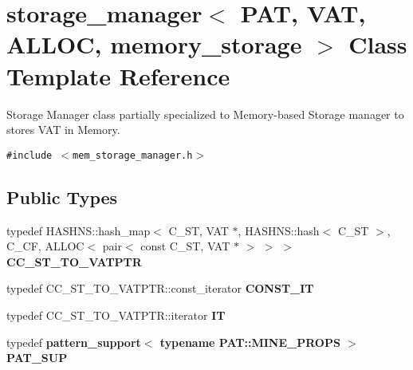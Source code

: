 \section{storage\_\-manager$<$ PAT, VAT, ALLOC, memory\_\-storage $>$ Class Template Reference}
\label{classstorage__manager_3_01PAT_00_01VAT_00_01ALLOC_00_01memory__storage_01_4}
Storage Manager class partially specialized to Memory-based Storage manager to stores VAT in Memory.  


{\tt \#include $<$mem\_\-storage\_\-manager.h$>$}

\subsection*{Public Types}
\begin{CompactItemize}
\item 
typedef HASHNS::hash\_\-map$<$ C\_\-ST, VAT $\ast$, HASHNS::hash$<$ C\_\-ST $>$, C\_\-CF, ALLOC$<$ pair$<$ const C\_\-ST, VAT $\ast$ $>$ $>$ $>$ \textbf{CC\_\-ST\_\-TO\_\-VATPTR}\label{classstorage__manager_3_01PAT_00_01VAT_00_01ALLOC_00_01memory__storage_01_4_d17789689203f8479b8502eda66b2e77}

\item 
typedef CC\_\-ST\_\-TO\_\-VATPTR::const\_\-iterator \textbf{CONST\_\-IT}\label{classstorage__manager_3_01PAT_00_01VAT_00_01ALLOC_00_01memory__storage_01_4_0c7e677f74d1894f192270ca6a3cbc79}

\item 
typedef CC\_\-ST\_\-TO\_\-VATPTR::iterator \textbf{IT}\label{classstorage__manager_3_01PAT_00_01VAT_00_01ALLOC_00_01memory__storage_01_4_6726099d0c66a5600e0849cf66f2197d}

\item 
typedef \bf{pattern\_\-support}$<$ typename PAT::MINE\_\-PROPS $>$ \textbf{PAT\_\-SUP}\label{classstorage__manager_3_01PAT_00_01VAT_00_01ALLOC_00_01memory__storage_01_4_771411d56b6a844cfb0c0a620b62618b}

\end{CompactItemize}
